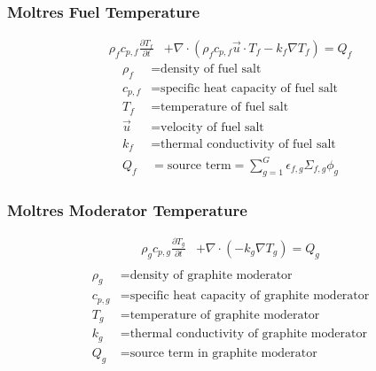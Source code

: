 \begin{frame}
        \frametitle{Moltres Fuel Temperature}
\begin{align}
        \rho_fc_{p,f}\frac{\partial T_f}{\partial t} &+ \nabla\cdot\left(\rho_f
        c_{p,f} \vec{u}\cdot T_f -k_f\nabla T_f\right) =  Q_f
\end{align}
\begin{align}
  \rho_f &= \mbox{density of fuel salt}\\
  c_{p,f} &= \mbox{specific heat capacity of fuel salt}\\
  T_f &= \mbox{temperature of fuel salt}\\
  \vec{u} &= \mbox{velocity of fuel salt}\\
  k_f &= \mbox{thermal conductivity of fuel salt}\\
  Q_f &= \mbox{source term} = \sum_{g=1}^G \epsilon_{f,g}\Sigma_{f,g}\phi_g
\end{align}
\end{frame}


\begin{frame}
        \frametitle{Moltres Moderator Temperature}
\begin{align}
        \rho_gc_{p,g}\frac{\partial T_g}{\partial t} &+
        \nabla\cdot\left(-k_g\nabla T_g\right) =  Q_g\\
\end{align}
\begin{align}
  \rho_g &= \mbox{density of graphite moderator}\\
  c_{p,g} &= \mbox{specific heat capacity of graphite moderator}\\
  T_g &= \mbox{temperature of graphite moderator}\\
  k_g &= \mbox{thermal conductivity of graphite moderator}\\
  Q_g &= \mbox{source term in graphite moderator}\\
\end{align}

\end{frame}



